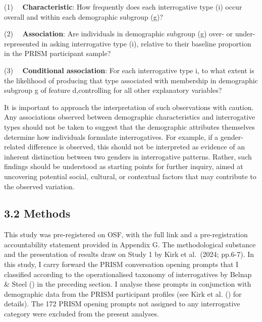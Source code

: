 \documentclass[
  12pt,
]{article}
\begin{document}
(1)~~ \textbf{Characteristic}: How frequently does each interrogative type (i) occur overall and within each demographic subgroup (g)?

(2)~~ \textbf{Association}: Are individuals in demographic subgroup (g) over- or under-represented in asking interrogative type (i), relative to their baseline proportion in the PRISM participant sample?

(3)~~ \textbf{Conditional association}: For each interrogative type i, to what extent is the likelihood of producing that type associated with membership in demographic subgroup g of feature d,controlling for all other explanatory variables?

It is important to approach the interpretation of such observations with caution. Any associations observed between demographic characteristics and interrogative types should not be taken to suggest that the demographic attributes themselves determine how individuals formulate interrogatives. For example, if a gender-related difference is observed, this should not be interpreted as evidence of an inherent distinction between two genders in interrogative patterns. Rather, such findings should be understood as starting points for further inquiry, aimed at uncovering potential social, cultural, or contextual factors that may contribute to the observed variation.

\subsection{3.2 Methods}\label{methods}

This study was pre-registered on OSF, with the full link and a pre-registration accountability statement provided in Appendix G. The methodological substance and the presentation of results draw on Study 1 by Kirk et al.~(2024; pp.6-7). In this study, I carry forward the PRISM conversation opening prompts that I classified according to the operationalised taxonomy of interrogatives by Belnap \& Steel () in the preceding section. I analyse these prompts in conjunction with demographic data from the PRISM participant profiles (see Kirk et al. () for details). The 172 PRISM opening prompts not assigned to any interrogative category were excluded from the present analyses.
\end{document}
